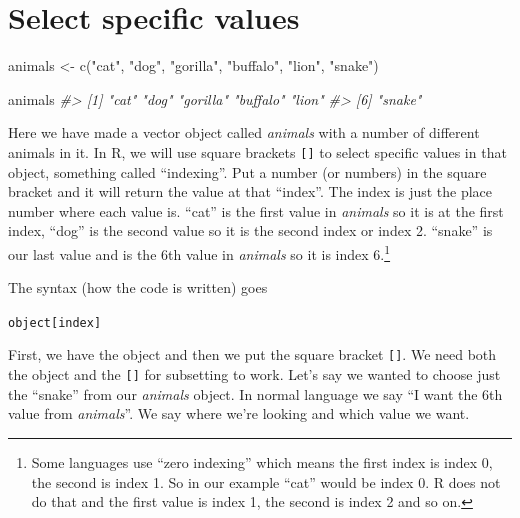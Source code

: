 \documentclass[
]{krantz}
\makeatletter
\newenvironment{Shaded}{\begin{snugshade}}{\end{snugshade}}
\newcommand{\CommentTok}[1]{\textcolor[rgb]{0.37,0.37,0.37}{\textit{#1}}}
\newcommand{\FunctionTok}[1]{\textcolor[rgb]{0,0,0}{#1}}
\newcommand{\NormalTok}[1]{#1}
\newcommand{\OtherTok}[1]{\textcolor[rgb]{0.37,0.37,0.37}{#1}}
\newcommand{\StringTok}[1]{\textcolor[rgb]{0.5,0.5,0.5}{#1}}
\newenvironment{kframe}{%
\medskip{}
\setlength{\fboxsep}{.8em}
 \def\at@end@of@kframe{}%
 \ifinner\ifhmode%
  \def\at@end@of@kframe{\end{minipage}}%
  \begin{minipage}{\columnwidth}%
 \fi\fi%
 \def\FrameCommand##1{\hskip\@totalleftmargin \hskip-\fboxsep
 \colorbox{shadecolor}{##1}\hskip-\fboxsep
     \hskip-\linewidth \hskip-\@totalleftmargin \hskip\columnwidth}%
 \MakeFramed {\advance\hsize-\width
   \@totalleftmargin\z@ \linewidth\hsize
   \@setminipage}}%
 {\par\unskip\endMakeFramed%
 \at@end@of@kframe}
\renewenvironment{Shaded}{\begin{kframe}}{\end{kframe}}
\makeatother
\begin{document}
\hypertarget{select-specific-values}{%
\section{Select specific
values}\label{select-specific-values}}

\begin{Shaded}
\begin{Highlighting}[]
\NormalTok{animals }\OtherTok{\textless{}{-}} \FunctionTok{c}\NormalTok{(}\StringTok{"cat"}\NormalTok{, }\StringTok{"dog"}\NormalTok{, }\StringTok{"gorilla"}\NormalTok{, }\StringTok{"buffalo"}\NormalTok{, }\StringTok{"lion"}\NormalTok{, }\StringTok{"snake"}\NormalTok{)}
\end{Highlighting}
\end{Shaded}

\begin{Shaded}
\begin{Highlighting}[]
\NormalTok{animals}
\CommentTok{\#\textgreater{} [1] "cat"     "dog"     "gorilla" "buffalo" "lion"   }
\CommentTok{\#\textgreater{} [6] "snake"}
\end{Highlighting}
\end{Shaded}

Here we have made a vector object called \emph{animals} with
a number of different animals in it. In R, we will use
square brackets \texttt{{[}{]}} to select specific values in
that object, something called ``indexing''. Put a number (or
numbers) in the square bracket and it will return the value
at that ``index''. The index is just the place number where
each value is. ``cat'' is the first value in \emph{animals}
so it is at the first index, ``dog'' is the second value so
it is the second index or index 2. ``snake'' is our last
value and is the 6th value in \emph{animals} so it is index
6.\footnote{Some languages use ``zero indexing'' which means
  the first index is index 0, the second is index 1. So in
  our example ``cat'' would be index 0. R does not do that
  and the first value is index 1, the second is index 2 and
  so on.}

The syntax (how the code is written) goes

\texttt{object{[}index{]}}

First, we have the object and then we put the square bracket
\texttt{{[}{]}}. We need both the object and the
\texttt{{[}{]}} for subsetting to work. Let's say we wanted
to choose just the ``snake'' from our \emph{animals} object.
In normal language we say ``I want the 6th value from
\emph{animals}''. We say where we're looking and which value
we want.
\end{document}
